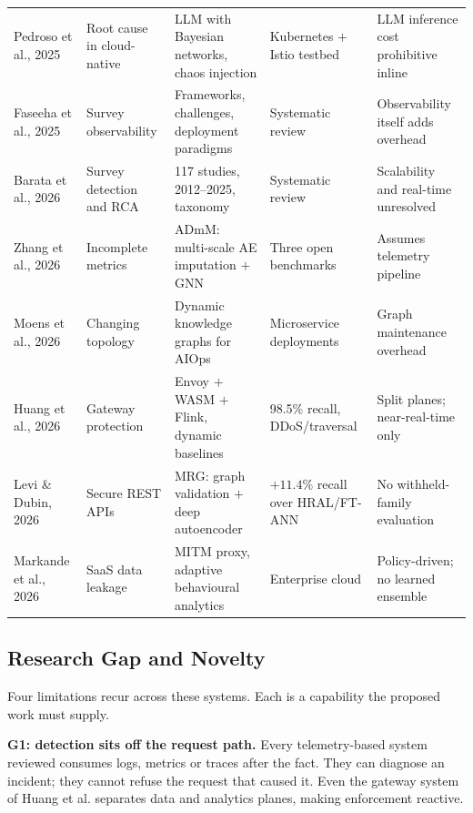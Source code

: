 \documentclass[conference]{IEEEtran}
\begin{document}
\begin{table}[!b]
\begin{tabularx}{\textwidth}{@{}P{2.15cm}P{2.6cm}LP{2.9cm}P{2.75cm}@{}}
Pedroso et al., 2025 \cite{pedroso2025llm} & Root cause in cloud-native &
LLM with Bayesian networks, chaos injection & Kubernetes $+$ Istio testbed &
LLM inference cost prohibitive inline \\
Faseeha et al., 2025 \cite{faseeha2025observability} & Survey observability &
Frameworks, challenges, deployment paradigms & Systematic review &
Observability itself adds overhead \\
Barata et al., 2026 \cite{barata2026survey} & Survey detection and RCA &
117 studies, 2012--2025, taxonomy & Systematic review &
Scalability and real-time unresolved \\
Zhang et al., 2026 \cite{zhang2026admm} & Incomplete metrics &
ADmM: multi-scale AE imputation $+$ GNN & Three open benchmarks &
Assumes telemetry pipeline \\
Moens et al., 2026 \cite{moens2026kg} & Changing topology &
Dynamic knowledge graphs for AIOps & Microservice deployments &
Graph maintenance overhead \\
Huang et al., 2026 \cite{huang2026gateway} & Gateway protection &
Envoy $+$ WASM $+$ Flink, dynamic baselines & 98.5\% recall, DDoS/traversal &
Split planes; near-real-time only \\
Levi \& Dubin, 2026 \cite{levi2026mrg} & Secure REST APIs &
MRG: graph validation $+$ deep autoencoder & $+11.4\%$ recall over HRAL/FT-ANN &
No withheld-family evaluation \\
Markande et al., 2026 \cite{markande2026saas} & SaaS data leakage &
MITM proxy, adaptive behavioural analytics & Enterprise cloud &
Policy-driven; no learned ensemble \\
\bottomrule
\end{tabularx}
\end{table}

\subsection{Research Gap and Novelty}
Four limitations recur across these systems. Each is a capability the proposed work must
supply.

\textbf{G1: detection sits off the request path.} Every telemetry-based system reviewed
\cite{liu2024lmgd}\cite{zhang2026admm}\cite{liu2020traceanomaly}\cite{kohyarnejadfard2022nlp}
\cite{raeiszadeh2025artfl}\cite{pedroso2025llm}\cite{moens2026kg} consumes logs, metrics or
traces after the fact. They can diagnose an incident; they cannot refuse the request that
caused it. Even the gateway system of Huang et al. \cite{huang2026gateway} separates data and
analytics planes, making enforcement reactive.
\end{document}
